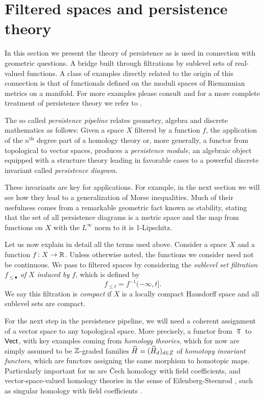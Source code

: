 
\section{Filtered spaces and persistence theory} \label{s:persistence}

In this section we present the theory of persistence as is used in connection with geometric questions.
A bridge built through filtrations by sublevel sets of real-valued functions.
A class of examples directly related to the origin of this connection is that of functionals defined on the moduli spaces of Riemannian metrics on a manifold.
For more examples please consult \cite{polterovich2020topological} and for a more complete treatment of persistence theory we refer to \cite{Chazal.2016a, MR3408277}.

The so called \textit{persistence pipeline} relates geometry, algebra and discrete mathematics as follows:
Given a space $X$ filtered by a function $f$, the application of the $n^{\mathrm{th}}$ degree part of a homology theory or, more generally, a functor from topological to vector spaces, produces a \textit{persistence module}, an algebraic object equipped with a structure theory leading in favorable cases to a powerful discrete invariant called \textit{persistence diagram}.

These invariants are key for applications.
For example, in the next section we will see how they lead to a generalization of Morse inequalities.
Much of their usefulness comes from a remarkable geometric fact known as stability, stating that the set of all persistence diagrams is a metric space and the map from functions on $X$ with the $L^\infty$ norm to it is 1-Lipschitz.

Let us now explain in detail all the terms used above.
Consider a space $X$ and a function $f \colon X \to \mathbb{R}$.
Unless otherwise noted, the functions we consider need not be continuous.
We pass to filtered spaces by considering the \textit{sublevel set filtration $f_{\leq \bullet}$ of $X$ induced by $f$}, which is defined by
\begin{equation*}
f_{\leq t} = f^{-1}(-\infty, t].
\end{equation*}
We say this filtration is \textit{compact} if $X$ is a locally compact Hausdorff space and all sublevel sets are compact.

For the next step in the persistence pipeline, we will need a coherent assignment of a vector space to any topological space.
More precisely, a functor from $\Top$ to $\mathsf{Vect}$, with key examples coming from \emph{homology theories}, which for now are simply assumed to be $\mathbb{Z}$-graded families $\widetilde{H} = (\widetilde{H}_d)_{d \in Z}$ of \emph{homotopy invariant functors}, which are functors assigning the same morphism to homotopic maps.
Particularly important for us are \v{C}ech homology \cite[Section IX-X]{MR0050886} with field coefficients, and vector-space-valued homology theories in the sense of Eilenberg-Steenrod \cite[Section I]{MR0050886}, such as singular homology with field coefficients \cite{Eilenberg.1944}.

